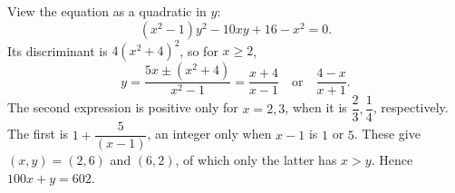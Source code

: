 View the equation as a quadratic in $y$:
\[
(x^2-1)y^2-10xy+16-x^2=0.
\]
Its discriminant is $4(x^2+4)^2$, so for $x\ge2$,
\[
y=\dfrac{5x\pm(x^2+4)}{x^2-1}
=\dfrac{x+4}{x-1}\quad\text{or}\quad\dfrac{4-x}{x+1}.
\]
The second expression is positive only for $x=2,3$, when it is $\dfrac{2}{3},\dfrac{1}{4}$, respectively. The first is $1+\dfrac{5}{(x-1)}$, an integer only when $x-1$ is $1$ or $5$. These give $(x,y)=(2,6)$ and $(6,2)$, of which only the latter has $x>y$. Hence $\boxed{100x+y=602}$.
